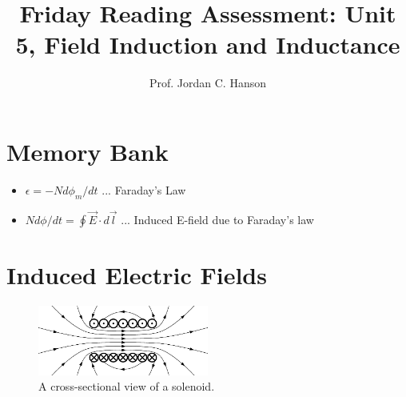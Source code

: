 \documentclass{article}
\begin{document}
\title{Friday Reading Assessment: Unit 5, Field Induction and Inductance}
\author{Prof. Jordan C. Hanson}

\maketitle

\section{Memory Bank}

\begin{itemize}
\item $\epsilon = -N d\phi_m /dt$ ... Faraday's Law
\item $Nd\phi/dt = \oint \vec{E} \cdot d\vec{l}$ ... Induced E-field due to Faraday's law
\end{itemize}

\section{Induced Electric Fields}

\begin{figure}
\centering
\includegraphics[width=0.5\textwidth]{solenoid.pdf}
\caption{\label{fig:solenoid1} A cross-sectional view of a solenoid.}
\end{figure}
\end{document}
